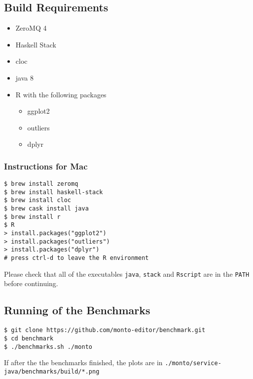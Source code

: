 \documentclass[12pt]{article}
\begin{document}
\subsection*{Build Requirements}

\begin{itemize}
\item ZeroMQ 4
\item Haskell Stack
\item cloc
\item java 8
\item R with the following packages
  \begin{itemize}
  \item ggplot2
  \item outliers
  \item dplyr
  \end{itemize}
\end{itemize}

\subsubsection*{Instructions for Mac}

\begin{lstlisting}
$ brew install zeromq
$ brew install haskell-stack
$ brew install cloc
$ brew cask install java
$ brew install r
$ R
> install.packages("ggplot2")
> install.packages("outliers")
> install.packages("dplyr")
# press ctrl-d to leave the R environment
\end{lstlisting}

Please check that all of the executables \lstinline|java|, \lstinline|stack| and \lstinline|Rscript| are in the \lstinline|PATH| before continuing.

\subsection*{Running of the Benchmarks}

\begin{lstlisting}
$ git clone https://github.com/monto-editor/benchmark.git
$ cd benchmark
$ ./benchmarks.sh ./monto
\end{lstlisting}

If after the the benchmarks finished, the plots are in \lstinline|./monto/service-java/benchmarks/build/*.png|
\end{document}
